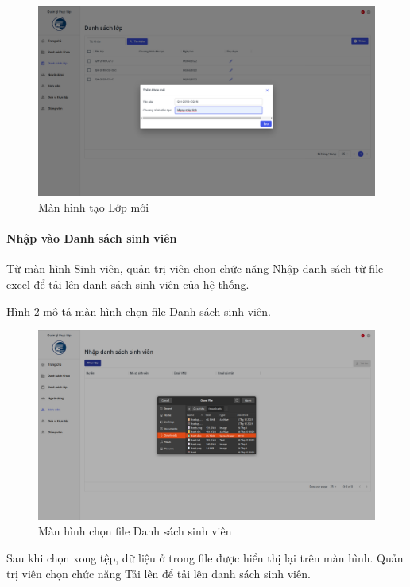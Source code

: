 \documentclass[./../main.tex]{subfiles}
\begin{document}
\begin{figure}[]
	\includegraphics[width=\linewidth]{./images/image25.png}
	\caption{Màn hình tạo Lớp mới}
	\label{fig:add_class}
\end{figure}

\paragraph*{Nhập vào Danh sách sinh viên}

Từ màn hình Sinh viên, quản trị viên chọn chức năng Nhập danh sách từ file excel để tải lên danh sách sinh viên của hệ thống.

Hình \ref{fig:choose_file} mô tả màn hình chọn file Danh sách sinh viên.

\begin{figure}[]
	\includegraphics[width=\linewidth]{./images/image27.png}
	\caption{Màn hình chọn file Danh sách sinh viên}
	\label{fig:choose_file}
\end{figure}

Sau khi chọn xong tệp, dữ liệu ở trong file được hiển thị lại trên màn hình. Quản trị viên chọn chức năng Tải lên để tải lên danh sách sinh viên.
\end{document}

